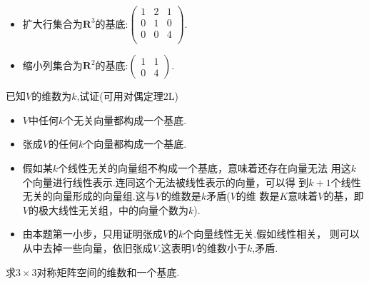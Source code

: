 ﻿\documentclass{book} \usepackage{exsheets} \usepackage{xeCJK}
\begin{document}
\begin{solution}
  \begin{itemize}
  \item     扩大行集合为$\mathbf{R}^{3}$的基底:$
    \begin{pmatrix}
      1&2&1\\
      0&1&0\\
      0&0&4\\
    \end{pmatrix}.  $
  \item     缩小列集合为$\mathbf{R}^2$的基底:$
    \begin{pmatrix}
      1&1\\
      0&4
    \end{pmatrix}.  $
  \end{itemize}
\end{solution}
\begin{question}
  已知$V$的维数为$k$,试证(可用对偶定理2L)
  \begin{itemize}
  \item     $V$中任何$k$个无关向量都构成一个基底.
  \item     张成$V$的任何$k$个向量都构成一个基底.
  \end{itemize}
\end{question}
\begin{solution}
  \begin{itemize}
  \item     假如某$k$个线性无关的向量组不构成一个基底，意味着还存在向量无法
    用这$k$个向量进行线性表示.连同这个无法被线性表示的向量，可以得
    到$k+1$个线性无关的向量形成的向量组.这与$V$的维数是$k$矛盾($V$的维
    数是$K$意味着$V$的基，即$V$的极大线性无关组，中的向量个数为$k$).
  \item     由本题第一小步，只用证明张成$V$的$k$个向量线性无关.假如线性相关，
    则可以从中去掉一些向量，依旧张成$V$.这表明$V$的维数小于$k$,矛盾.
  \end{itemize}
\end{solution}
\begin{question}
  求$3\times 3$对称矩阵空间的维数和一个基底.
\end{question}
\end{document}
